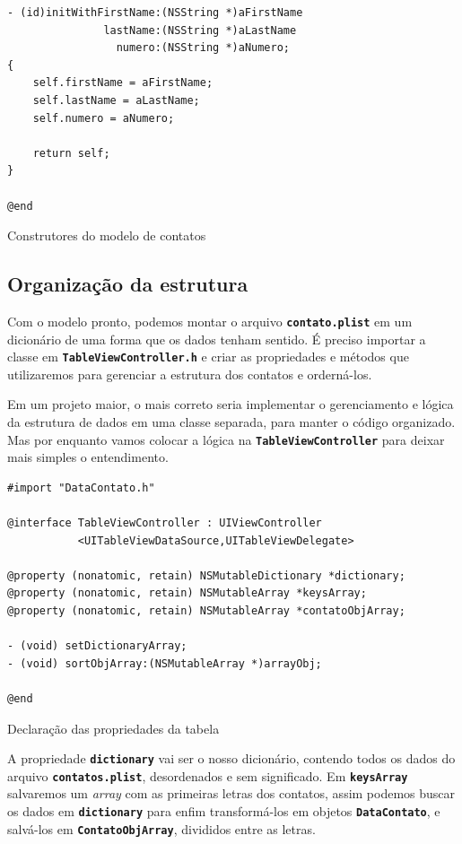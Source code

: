 \documentclass[a4paper,12pt,brazil,doubleside]{book}
\begin{document}
\begin{singlespace}
\begin{listing}[H]
\begin{verbatim}
- (id)initWithFirstName:(NSString *)aFirstName
               lastName:(NSString *)aLastName
                 numero:(NSString *)aNumero;
{    
    self.firstName = aFirstName;
    self.lastName = aLastName;
    self.numero = aNumero;
    
    return self;
}

@end
\end{verbatim}
\caption{Construtores do modelo de contatos}
\end{listing}

\subsection{Organização da estrutura}


Com o modelo pronto, podemos montar o arquivo \texttt{\textbf{contato.plist}} em um dicionário de uma forma que os dados tenham sentido. É preciso importar a classe em \texttt{\textbf{TableViewController.h}} e criar as propriedades e métodos que utilizaremos para gerenciar a estrutura dos contatos e orderná-los.

Em um projeto maior, o mais correto seria implementar o gerenciamento e lógica da estrutura de dados em uma classe separada, para manter o código organizado. Mas por enquanto vamos colocar a lógica na \texttt{\textbf{TableViewController}} para deixar mais simples o entendimento.

\begin{listing}[H]
\begin{verbatim}
#import "DataContato.h"

@interface TableViewController : UIViewController 
           <UITableViewDataSource,UITableViewDelegate>

@property (nonatomic, retain) NSMutableDictionary *dictionary;
@property (nonatomic, retain) NSMutableArray *keysArray;
@property (nonatomic, retain) NSMutableArray *contatoObjArray;

- (void) setDictionaryArray;
- (void) sortObjArray:(NSMutableArray *)arrayObj;

@end
\end{verbatim}
\caption{Declaração das propriedades da tabela}
\end{listing}


A propriedade \texttt{\textbf{dictionary}} vai ser o nosso dicionário, contendo todos os dados do arquivo \texttt{\textbf{contatos.plist}}, desordenados e sem significado. Em \texttt{\textbf{keysArray}} salvaremos um \emph{array} com as primeiras letras dos contatos, assim podemos buscar os dados em \texttt{\textbf{dictionary}} para enfim transformá-los em objetos \texttt{\textbf{DataContato}}, e salvá-los em \texttt{\textbf{ContatoObjArray}}, divididos entre as letras.


\end{singlespace}
\end{document}
